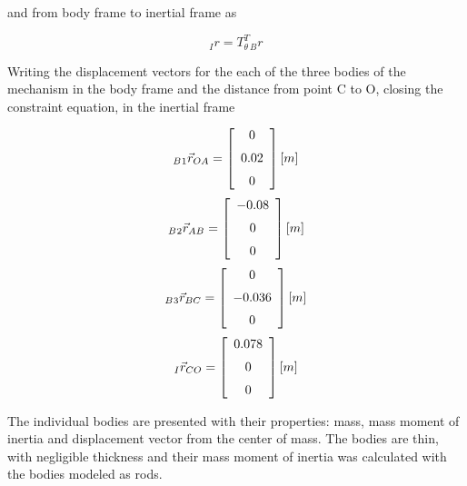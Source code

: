 and from body frame to inertial frame as

\begin{equation}\label{b_to_I}
_{I}{r} = T_{\theta}^T {_B }{r}
\end{equation}


Writing the displacement vectors for the each of the three bodies of the mechanism in the body frame and the distance from point C to O, closing the constraint equation, in the inertial frame


\begin{equation} \label{disp_vec1}
 _B{_1}\vec{r}_{OA} = \left[ \begin {array}{c} 0\\ \noalign{\medskip} 0.02
\\ \noalign{\medskip}0\end {array} \right ]   [m]
\end{equation}
\begin{equation}\label{disp_vec2}
 _B{_2}\vec{r}_{AB} = \left[ \begin {array}{c} - 0.08\\ \noalign{\medskip}0
\\ \noalign{\medskip}0\end {array} \right] [m]
\end{equation}
\begin{equation}\label{disp_vec3}
_B{_3}\vec{r}_{BC} =  \left[ \begin {array}{c} 0\\ \noalign{\medskip}- 0.036
\\ \noalign{\medskip}0\end {array} \right]  [m]
\end{equation}
\begin{equation}\label{disp_vec4}
_I\vec{r}_{CO} =  \left[ \begin {array}{c}  0.078\\ \noalign{\medskip}0
\\ \noalign{\medskip}0\end {array} \right] [m]
\end{equation}

The individual bodies are presented with their properties: mass, mass moment of inertia and displacement vector from the center of mass. The bodies are thin, with negligible thickness and their mass moment of inertia was calculated with the bodies modeled as rods.


